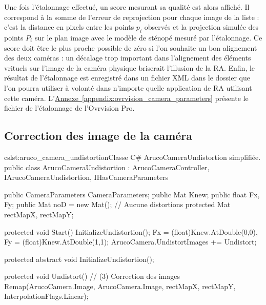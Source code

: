 Une fois l'étalonnage effectué, un score mesurant sa qualité est alors affiché. Il correspond à la somme de l'erreur de reprojection pour chaque image de la liste : c'est la distance en pixels entre les points $p_i$ observés et la projection simulée des points $P_i$ sur le plan image avec le modèle de sténopé mesuré par l'étalonnage. Ce score doit être le plus proche possible de zéro si l'on souhaite un bon alignement des deux caméras : un décalage trop important dans l'alignement des éléments vrituels sur l'image de la caméra physique briserait l'illusion de la RA. Enfin, le résultat de l'étalonnage est enregistré dans un fichier XML dans le dossier  que l'on pourra utiliser à volonté dans n'importe quelle application de RA utilisant cette caméra. L'\hyperref[appendix:ovrvision_camera_parameters]{Annexe~\ref{appendix:ovrvision_camera_parameters}} présente le fichier de l'étalonnage de l'Ovrvision Pro.

\subsection{Correction des image de la caméra}
\label{subsec:pinhole_camera_undistortion}


\begin{listingETS}{cs}{lst:aruco_camera_undistortion}{Classe C\# ArucoCameraUndistortion simplifiée.}
  public class ArucoCameraUndistortion : ArucoCameraController, IArucoCameraUndistortion, IHasCameraParameters
  {
    public CameraParameters CameraParameters;
    public Mat Knew;
    public float Fx, Fy;
    public Mat noD = new Mat(); // Aucune distortions
    protected Mat rectMapX, rectMapY;

    protected void Start()
    {
      InitializeUndistortion();
      Fx = (float)Knew.AtDouble(0,0), Fy = (float)Knew.AtDouble(1,1);
      ArucoCamera.UndistortImages += Undistort;
    }

    protected abstract void InitializeUndistortion();

    protected void Undistort() // (3) Correction des images
    {
      Remap(ArucoCamera.Image, ArucoCamera.Image, rectMapX, rectMapY, InterpolationFlags.Linear);
    }
  }
\end{listingETS}

